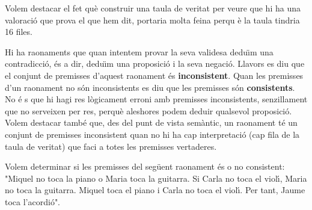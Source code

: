 \begin{solucio}
Volem destacar el fet qu\`{e} construir una taula de veritat per veure que
hi ha una valoraci\'{o} que prova el que hem dit, portaria molta feina perqu%
\`{e} la taula tindria 16 files.
\end{solucio}

\bigskip

Hi ha raonaments que quan intentem provar la seva validesa dedu\"{\i}m una
contradicci\'{o}, \'{e}s a dir, dedu\"{\i}m una proposici\'{o} i la seva
negaci\'{o}. Llavors es diu que el conjunt de premisses d'aquest raonament
\'{e}s \textbf{inconsistent}. Quan les premisses d'un raonament no s\'{o}n
inconsistents es diu que les premisses s\'{o}n \textbf{consistents}. No \'{e}%
s que hi hagi res l\`{o}gicament erroni amb premisses inconsistents,
senzillament que no serveixen per res, perqu\`{e} aleshores podem deduir
qualsevol proposici\'{o}. Volem destacar tamb\'{e} que, des del punt de
vista sem\`{a}ntic, un raonament t\'{e} un conjunt de premisses inconsistent
quan no hi ha cap interpretaci\'{o} (cap fila de la taula de veritat) que
faci a totes les premisses vertaderes.

\begin{exem}
Volem determinar si les premisses del seg\"{u}ent raonament \'{e}s o no
consistent: "Miquel no toca la piano o Maria toca la guitarra. Si Carla no
toca el viol\'{\i}, Maria no toca la guitarra. Miquel toca el piano i Carla
no toca el viol\'{\i}. Per tant, Jaume toca l'acordi\'{o}".
\end{exem}


